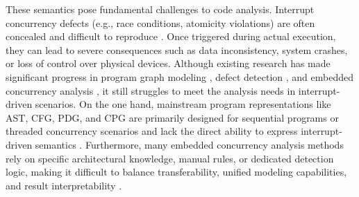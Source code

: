 \documentclass[conference]{IEEEtran}
\begin{document}
These semantics pose fundamental challenges to code analysis. Interrupt concurrency defects (e.g., race conditions, atomicity violations) are often concealed and difficult to reproduce \cite{li2023empirical}. Once triggered during actual execution, they can lead to severe consequences such as data inconsistency, system crashes, or loss of control over physical devices. Although existing research has made significant progress in program graph modeling \cite{yamaguchi2014modeling, mi2023graph, liu2023learning, shezan2023chkplug}, defect detection \cite{eslamimehr2018efficient, zhang2025effectively, qiu2024vulnerability, smaili2025transformer, ma2025value, wang2025sift}, and embedded concurrency analysis \cite{wang2017automatic, li2022precise, yu2023detecting, wang2022specchecker, wu2016static, zhang2025bounded, zhao2025formal, wu2015numerical, schwarz2011static, shi2015verifying, yu2018conpredictor, wang2020automatic, liang2017effective, ma2026integrating}, it still struggles to meet the analysis needs in interrupt-driven scenarios. On the one hand, mainstream program representations like AST, CFG, PDG, and CPG are primarily designed for sequential programs or threaded concurrency scenarios and lack the direct ability to express interrupt-driven semantics \cite{zhu2023code}. Furthermore, many embedded concurrency analysis methods rely on specific architectural knowledge, manual rules, or dedicated detection logic, making it difficult to balance transferability, unified modeling capabilities, and result interpretability \cite{feng2020rchecker, wang2025specchecker}.
\end{document}
